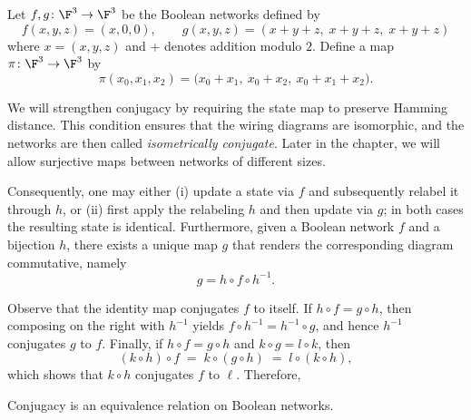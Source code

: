 \begin{example}\label{ex:fully-coupled}
    Let $f,g\colon\F^3\to\F^3$ be the Boolean networks defined by
    \[
        f(x,y,z)=(x,0,0),\qquad  g(x,y,z)=(x+y+z,\;x+y+z,\;x+y+z)
    \]
    where $x=(x,y,z)$ and $+$ denotes addition modulo $2$. Define a map $\pi\colon\F^3\to\F^3$ by
    \[
        \pi(x_0,x_1,x_2)
        =\bigl(x_0+ x_1,\ x_0+ x_2,\ x_0+ x_1+ x_2\bigr).
    \]
\end{example}









We will strengthen conjugacy by requiring the state map to preserve Hamming distance. This condition ensures that the wiring diagrams are isomorphic, and the networks are then called \emph{isometrically conjugate}. Later in the chapter, we will allow surjective maps between networks of different sizes.

Consequently, one may either (i) update a state via $f$ and subsequently relabel it through $h$, or (ii) first apply the relabeling $h$ and then update via $g$; in both cases the resulting state is identical. Furthermore, given a Boolean network $f$ and a bijection $h$, there exists a unique map $g$ that renders the corresponding diagram commutative, namely
\[
g = h\circ f\circ h^{-1}.
\]

Observe that the identity map conjugates $f$ to itself. If $h\circ f = g\circ h$, then composing on the right with $h^{-1}$ yields $f\circ h^{-1} = h^{-1}\circ g$, and hence $h^{-1}$ conjugates $g$ to $f$. Finally, if $h\circ f = g\circ h$ and $k\circ g = l\circ k$, then
\[
(k\circ h)\circ f \;=\; k\circ(g\circ h)\;=\; l\circ(k\circ h),
\]
which shows that $k\circ h$ conjugates $f$ to $\ell$. Therefore,
\begin{proposition}
    Conjugacy is an equivalence relation on Boolean networks.
\end{proposition}

